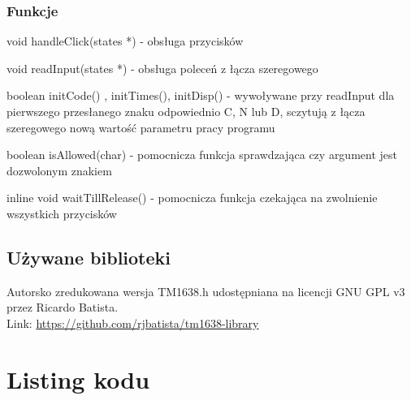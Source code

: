 \documentclass[a4paper,12pt]{article}
\begin{document}
\subsubsection{Funkcje}
\par void handleClick(states *) - obsługa przycisków
\par void readInput(states *) - obsługa poleceń z łącza szeregowego
\par boolean initCode() , initTimes(), initDisp() - wywoływane przy readInput dla pierwszego przesłanego znaku odpowiednio C, N lub D, sczytują z łącza szeregowego nową wartość parametru pracy programu
\par boolean isAllowed(char) - pomocnicza funkcja sprawdzająca czy argument jest dozwolonym znakiem
\par inline void waitTillRelease() - pomocnicza funkcja czekająca na zwolnienie wszystkich przycisków

\subsection{Używane biblioteki}
Autorsko zredukowana wersja TM1638.h udostępniana na licencji GNU GPL v3 przez Ricardo Batista.\\
Link: \href{https://github.com/rjbatista/tm1638-library}{https://github.com/rjbatista/tm1638-library}

\section{Listing kodu}


\end{document}
